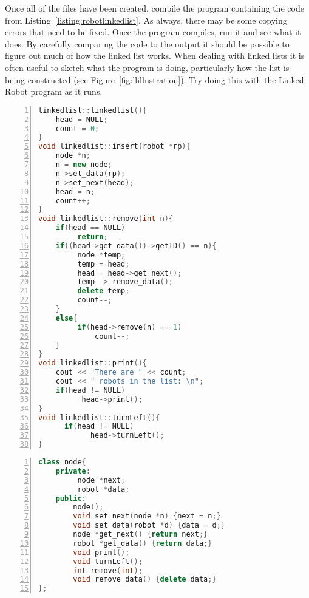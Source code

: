 Once all of the files have been created, compile the program containing the code from Listing~\ref{listing:robotlinkedlist}.  As always, there may be some copying errors that need to be fixed.  Once the program compiles, run it and see what it does.  By carefully comparing the code to the output it should be possible to figure out much of how the linked list works.  When dealing with linked lists it is often useful to sketch what the program is doing, particularly how the list is being constructed (see Figure~\ref{fig:llillustration}).  Try doing this with the Linked Robot program as it runs.

\begin{minipage}{\textwidth}
\renewcommand*\thelstnumber{\the\value{lstnumber}b}
\begin{lstlisting}[language=C++,numbers = left,xleftmargin=4.0ex, basicstyle=\small, emph={count,head,n,temp},emphstyle = \color{\mycolor},
showstringspaces=false,
caption = {The definition of the \cf{linkedlist} class functions. },
label={listing:llcpp}]
linkedlist::linkedlist(){
    head = NULL;
    count = 0;
}
void linkedlist::insert(robot *rp){
    node *n;
    n = new node;
    n->set_data(rp);
    n->set_next(head);
    head = n;
    count++;
}
void linkedlist::remove(int n){
    if(head == NULL)
         return;
    if((head->get_data())->getID() == n){
         node *temp;
         temp = head;
         head = head->get_next();
         temp -> remove_data();
         delete temp;
         count--;
    }
    else{
         if(head->remove(n) == 1)
             count--;    
    }
}
void linkedlist::print(){
    cout << "There are " << count;
    cout << " robots in the list: \n";
    if(head != NULL)
          head->print();
}
void linkedlist::turnLeft(){
      if(head != NULL)
            head->turnLeft();
}
\end{lstlisting}
\end{minipage}


\begin{minipage}{\textwidth}
\renewcommand*\thelstnumber{\the\value{lstnumber}c}
\begin{lstlisting}[language=C++,numbers = left,xleftmargin=4.0ex, basicstyle=\small, emph={next,data},emphstyle = \color{\mycolor},
showstringspaces=false,
caption = {The declaration of the \cf{node} class. },
label={listing:nodeh}]
class node{
    private:
         node *next;
         robot *data;
    public:
        node();
        void set_next(node *n) {next = n;}
        void set_data(robot *d) {data = d;}
        node *get_next() {return next;}
        robot *get_data() {return data;}
        void print();
        void turnLeft();
        int remove(int);
        void remove_data() {delete data;}
};
\end{lstlisting}
\end{minipage}

